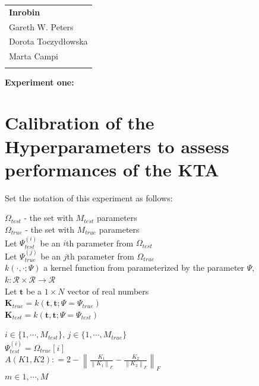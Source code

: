 \documentclass[11pt, a4paper]{article} %
\begin{document}
	
	
\setlength{\parindent}{0pt} %
\onehalfspacing				%


\begin{tabular}{p{15.5cm}}
	{\large \textbf{Inrobin}} \\
	Gareth W. Peters  \\ 
	Dorota Toczydłowska\\
	Marta Campi\\
	\hline
	\\
\end{tabular}

\vspace*{0.3cm}				%


\begin{center}
	{\LARGE \textbf{Experiment one:}}
	\vspace{2mm}	
\end{center} 



\section*{Calibration of the Hyperparameters to assess performances of the KTA}

Set the notation of this experiment as follows:

$\Omega_{test}$ - the set with $M_{test}$ parameters\\
$\Omega_{true}$ - the set with $M_{true}$ parameters\\
Let $\Psi_{test}^{(i)}$ be an $i$th parameter from $\Omega_{test}$\\
Let $\Psi_{true}^{(j)}$ be an $j$th parameter from $ \Omega_{true}$\\
$k(\cdot, \cdot;\Psi)$ a kernel function from parameterized by the parameter $\Psi$,  $k: \mathcal{R} \times \mathcal{R} \rightarrow \mathcal{R}$\\ 
Let $\mathbf{t}$ be a $1\times N$ vector of real numbers\\
$\mathbf{K}_{true} = k(\mathbf{t}, \mathbf{t};\Psi = \Psi_{true})$\\
$\mathbf{K}_{test} = k(\mathbf{t}, \mathbf{t};\Psi = \Psi_{test})$

$i \in \Big\{ 1, \cdots, M_{test} \Big\}$, $j \in \Big\{ 1, \cdots, M_{true} \Big\}$\\
$\Psi_{test}^{(i)} = \Omega_{true} [i]$\\
$A(K1,K2) : = 2 - \left\| \frac{K_1}{\left\| K_1 \right\|_F} - \frac{K_2}{\left\| K_2 \right\|_F} \right\|_F$\\
$m \in {1, \cdots, M}$
\end{document}

